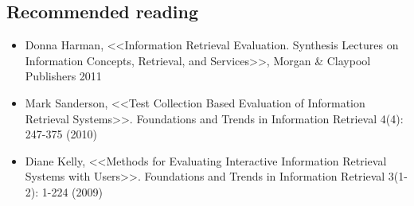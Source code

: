 \subsection{Recommended reading}
\begin{itemize}
\item Donna Harman, <<Information Retrieval Evaluation. Synthesis Lectures on Information Concepts, Retrieval, and Services>>, Morgan \& Claypool Publishers 2011
\item Mark Sanderson, <<Test Collection Based Evaluation of Information Retrieval Systems>>. Foundations and Trends in Information Retrieval 4(4): 247-375 (2010)
\item  Diane Kelly, <<Methods for Evaluating Interactive Information Retrieval Systems with Users>>. Foundations and Trends in Information Retrieval 3(1-2): 1-224 (2009)
\end{itemize}




